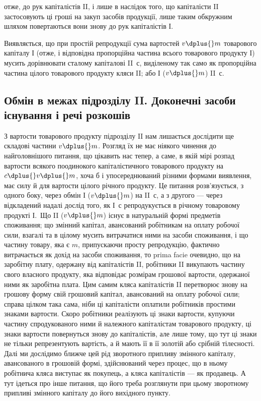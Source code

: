 \parcont{}  %
отже, до рук капіталістів II, і лише в наслідок того, що капіталісти II застосовують
ці гроші на закуп засобів продукції, лише таким обкружним
шляхом повертаються вони знову до рук капіталістів І.

Виявляється, що при простій репродукції сума вартостей $v \dplus{} m$ товарового
капіталу І (отже, і відповідна пропорційна частина всього товарового
продукту І) мусить дорівнювати сталому капіталові II~$с$, виділеному
так само як пропорційна частина цілого товарового продукту кляси II;
або І ($v \dplus{} m$) \deq{} II~с.

\subsection[Обмін в межах підрозділу II. Доконечні засоби існування і речі розкошів]{Обмін в межах підрозділу II. Доконечні засоби\\ 
існування і речі розкошів}

З вартости товарового продукту підрозділу II нам лишається дослідити
ще складові частини $v \dplus{} m$. Розгляд їх не має ніякого чинення до
найголовнішого питання, що цікавить нас тепер, а саме, в якій мірі
розпад вартости всякого поодинокого капіталістичного товарового продукту
на $c \dplus{} v \dplus{} m$, хоча б і упосереднюваний різними формами виявлення,
має силу й для вартости цілого річного продукту. Це питання
розв’язується, з одного боку, через обмін І ($v \dplus{} m$) на II~$с$, а з другого
— через відкладений надалі дослід того, як І~$с$ репродукується в
річному товаровому продукті І.~Що II ($v \dplus{} m$) існує в натуральній формі
предметів споживання; що змінний капітал, авансований робітникам на
оплату робочої сили, взагалі та в цілому мусить витрачатися ними на
засоби споживання, і що частину товару, яка є $m$, припускаючи просту
репродукцію, фактично витрачається як дохід на засоби споживання, то
prima facie очевидно, що на заробітну плату, одержану від капіталістів
II, робітники II викупають частину свого власного продукту, яка відповідає
розмірам грошової вартости, одержаної ними як заробітна плата. Цим
самим кляса капіталістів II перетворює знову на грошову форму свій
грошовий капітал, авансований на оплату робочої сили; справа цілком
така сама, ніби ці капіталісти оплатили робітників простими знаками вартости.
Скоро робітники реалізують ці знаки вартости, купуючи частину
спродукованого ними й належного капіталістам товарового продукту, ці
знаки вартости повернуться знову до капіталістів, але лише тому, що тут
ці знаки не тільки репрезентують вартість, а й мають її в її золотій
або срібній тілесності. Далі ми дослідимо ближче цей рід зворотного
припливу змінного капіталу, авансованого в грошовій формі, здійснюваний
через процес, що в ньому робітнича кляса виступає як покупець, а
кляса капіталістів — як продавець. А тут ідеться про інше питання,
що його треба розглянути при цьому зворотному припливі змінного
капіталу до його вихідного пункту.

